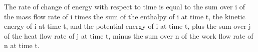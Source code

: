 The rate of change of energy with respect to time is equal to the sum over i of the mass flow rate of i times the sum of the enthalpy of i at time t, the kinetic energy of i at time t, and the potential energy of i at time t, plus the sum over j of the heat flow rate of j at time t, minus the sum over n of the work flow rate of n at time t.